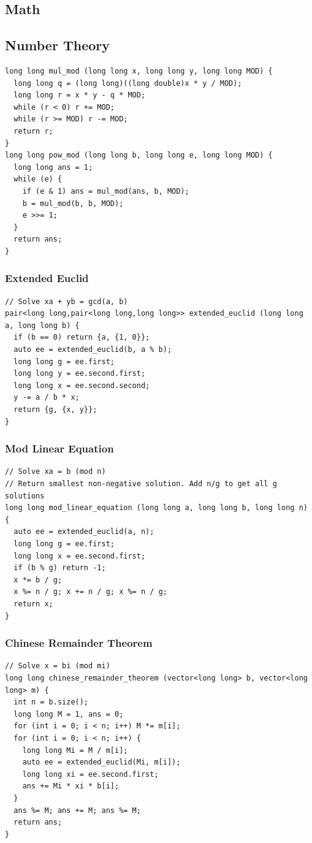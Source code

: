 \documentclass[10pt,letterpaper,landscape]{article}
\begin{document}
\begin{multicols}{2}
\section{Math}
\subsection{Number Theory}
\begin{lstlisting}
long long mul_mod (long long x, long long y, long long MOD) {
  long long q = (long long)((long double)x * y / MOD);
  long long r = x * y - q * MOD;
  while (r < 0) r += MOD;
  while (r >= MOD) r -= MOD;
  return r;
}
long long pow_mod (long long b, long long e, long long MOD) {
  long long ans = 1;
  while (e) {
    if (e & 1) ans = mul_mod(ans, b, MOD);
    b = mul_mod(b, b, MOD);
    e >>= 1;
  }
  return ans;
}
\end{lstlisting}
\subsubsection{Extended Euclid}
\begin{lstlisting}
// Solve xa + yb = gcd(a, b)
pair<long long,pair<long long,long long>> extended_euclid (long long a, long long b) {
  if (b == 0) return {a, {1, 0}};
  auto ee = extended_euclid(b, a % b);
  long long g = ee.first;
  long long y = ee.second.first;
  long long x = ee.second.second;
  y -= a / b * x;
  return {g, {x, y}};
}
\end{lstlisting}
\subsubsection{Mod Linear Equation}
\begin{lstlisting}
// Solve xa = b (mod n)
// Return smallest non-negative solution. Add n/g to get all g solutions
long long mod_linear_equation (long long a, long long b, long long n) {
  auto ee = extended_euclid(a, n);
  long long g = ee.first;
  long long x = ee.second.first;
  if (b % g) return -1;
  x *= b / g;
  x %= n / g; x += n / g; x %= n / g;
  return x;
}
\end{lstlisting}
\subsubsection{Chinese Remainder Theorem}
\begin{lstlisting}
// Solve x = bi (mod mi)
long long chinese_remainder_theorem (vector<long long> b, vector<long long> m) {
  int n = b.size();
  long long M = 1, ans = 0;
  for (int i = 0; i < n; i++) M *= m[i];
  for (int i = 0; i < n; i++) {
    long long Mi = M / m[i];
    auto ee = extended_euclid(Mi, m[i]);
    long long xi = ee.second.first;
    ans += Mi * xi * b[i];
  }
  ans %= M; ans += M; ans %= M;
  return ans;
}
\end{lstlisting}

\end{multicols}
\end{document}
